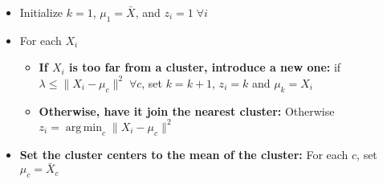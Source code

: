 \documentclass[11pt]{article}
\theoremstyle{definition}
\DeclareMathOperator*{\argmin}{arg\,min}
\begin{document}
\begin{itemize}
    \item Initialize $k=1$, $\mu_1 = \bar X$, and $z_i=1 \;\forall i$
    \item For each $X_i$
        \begin{itemize}
            \item {\bf If $X_i$ is too far from a cluster, introduce a new one:} if \(\lambda \leq \|X_i-\mu_c\|^2 \; \forall c\), set $k=k+1$, $z_i=k$ and $\mu_k=X_i$
            \item {\bf Otherwise, have it join the nearest cluster:} Otherwise $z_i=\argmin_c\|X_i-\mu_c\|^2$
        \end{itemize}
    \item {\bf Set the cluster centers to the mean of the cluster:} For each $c$, set $\mu_c = \bar X_c$
\end{itemize}
\end{document}

